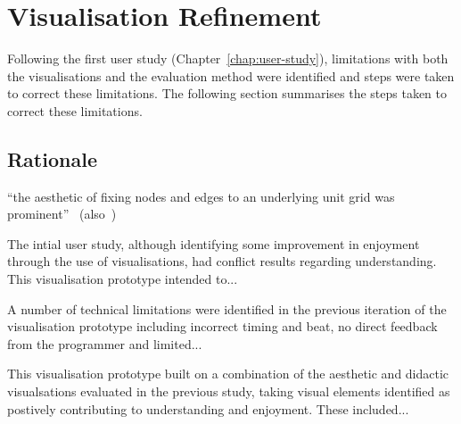 
\chapter{Visualisation Refinement}
\label{chap:visualisation-refinement}


Following the first user study (Chapter~\ref{chap:user-study}), limitations with both the visualisations and the evaluation method were identified and steps were taken to correct these limitations. The following section summarises the steps taken to correct these limitations.

\section{Rationale}

``the aesthetic of fixing nodes and edges to an underlying unit grid was prominent''~\cite{Purchase2014} (also~\cite{Purchase2001,Purchase1996})

The intial user study, although identifying some improvement in enjoyment through the use of visualisations, had conflict results regarding understanding. This visualisation prototype intended to... \more

A number of technical limitations were identified in the previous iteration of the visualisation prototype including incorrect timing and beat, no direct feedback from the programmer and limited... \more

This visualisation prototype built on a combination of the aesthetic and didactic visualsations evaluated in the previous study, taking visual elements identified as postively contributing to understanding and enjoyment. These included... \more


